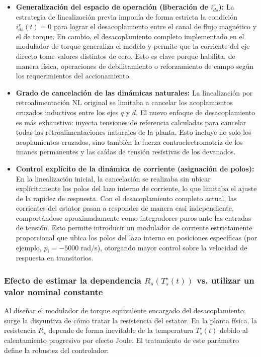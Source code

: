 \documentclass[12pt, a4paper,journal, onecolumn, compsoc]{IEEEtran}
\begin{document}
\begin{itemize}
    \item \textbf{Generalización del espacio de operación (liberación de $i_{ds}^r$):} 
    La estrategia de linealización previa imponía de forma estricta la condición $i_{ds}^r(t)=0$ para lograr el desacoplamiento entre el canal de flujo magnético y el de torque. En cambio, el desacoplamiento completo implementado en el modulador de torque generaliza el modelo y permite que la corriente del eje directo tome valores distintos de cero. Esto es clave porque habilita, de manera física, operaciones de debilitamiento o reforzamiento de campo según los requerimientos del accionamiento.
    
    \item \textbf{Grado de cancelación de las dinámicas naturales:} 
    La linealización por retroalimentación NL original se limitaba a cancelar los acoplamientos cruzados inductivos entre los ejes $q$ y $d$. El nuevo enfoque de desacoplamiento es más exhaustivo: inyecta tensiones de referencia calculadas para cancelar todas las retroalimentaciones naturales de la planta. Esto incluye no solo los acoplamientos cruzados, sino también la fuerza contraelectromotriz de los imanes permanentes y las caídas de tensión resistivas de los devanados.
    
    \item \textbf{Control explícito de la dinámica de corriente (asignación de polos):} 
    En la linealización inicial, la cancelación se realizaba sin ubicar explícitamente los polos del lazo interno de corriente, lo que limitaba el ajuste de la rapidez de respuesta. Con el desacoplamiento completo actual, las corrientes del estator pasan a responder de manera casi independiente, comportándose aproximadamente como integradores puros ante las entradas de tensión. Esto permite introducir un modulador de corriente estrictamente proporcional que ubica los polos del lazo interno en posiciones específicas (por ejemplo, $p_i=-5000$ rad/s), otorgando mayor control sobre la velocidad de respuesta en transitorios.
\end{itemize}


\subsubsection{Efecto de estimar la dependencia $R_s(T_s^\circ(t))$ vs. utilizar un valor nominal constante}

Al diseñar el modulador de torque equivalente encargado del desacoplamiento, surge la disyuntiva de cómo tratar la resistencia del estator. En la planta física, la resistencia $R_s$ depende de forma inevitable de la temperatura $T_s^\circ(t)$ debido al calentamiento progresivo por efecto Joule. El tratamiento de este parámetro define la robustez del controlador:
\end{document}
